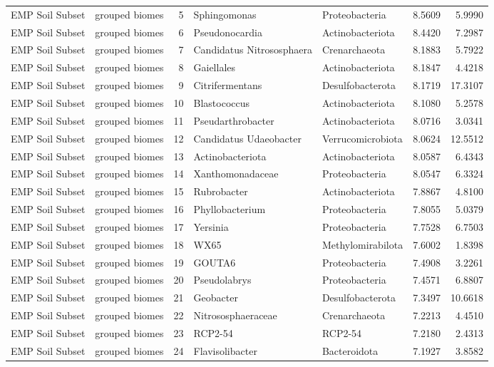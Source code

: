\documentclass[12pt, oneside]{report}
\begin{document}
\begin{center}
\begin{longtable}{llrp{2.7cm}p{2.2cm}rr}
EMP Soil Subset & grouped biomes & 5 & Sphingomonas & Proteobacteria & 8.5609 & 5.9990 \\
EMP Soil Subset & grouped biomes & 6 & Pseudonocardia & Actinobacteriota & 8.4420 & 7.2987 \\
EMP Soil Subset & grouped biomes & 7 & Candidatus Nitrososphaera & Crenarchaeota & 8.1883 & 5.7922 \\
EMP Soil Subset & grouped biomes & 8 & Gaiellales & Actinobacteriota & 8.1847 & 4.4218 \\
EMP Soil Subset & grouped biomes & 9 & Citrifermentans & Desulfobacterota & 8.1719 & 17.3107 \\
EMP Soil Subset & grouped biomes & 10 & Blastococcus & Actinobacteriota & 8.1080 & 5.2578 \\
EMP Soil Subset & grouped biomes & 11 & Pseudarthrobacter & Actinobacteriota & 8.0716 & 3.0341 \\
EMP Soil Subset & grouped biomes & 12 & Candidatus Udaeobacter & Verrucomicrobiota & 8.0624 & 12.5512 \\
EMP Soil Subset & grouped biomes & 13 & Actinobacteriota & Actinobacteriota & 8.0587 & 6.4343 \\
EMP Soil Subset & grouped biomes & 14 & Xanthomonadaceae & Proteobacteria & 8.0547 & 6.3324 \\
EMP Soil Subset & grouped biomes & 15 & Rubrobacter & Actinobacteriota & 7.8867 & 4.8100 \\
EMP Soil Subset & grouped biomes & 16 & Phyllobacterium & Proteobacteria & 7.8055 & 5.0379 \\
EMP Soil Subset & grouped biomes & 17 & Yersinia & Proteobacteria & 7.7528 & 6.7503 \\
EMP Soil Subset & grouped biomes & 18 & WX65 & Methylomirabilota & 7.6002 & 1.8398 \\
EMP Soil Subset & grouped biomes & 19 & GOUTA6 & Proteobacteria & 7.4908 & 3.2261 \\
EMP Soil Subset & grouped biomes & 20 & Pseudolabrys & Proteobacteria & 7.4571 & 6.8807 \\
EMP Soil Subset & grouped biomes & 21 & Geobacter & Desulfobacterota & 7.3497 & 10.6618 \\
EMP Soil Subset & grouped biomes & 22 & Nitrososphaeraceae & Crenarchaeota & 7.2213 & 4.4510 \\
EMP Soil Subset & grouped biomes & 23 & RCP2-54 & RCP2-54 & 7.2180 & 2.4313 \\
EMP Soil Subset & grouped biomes & 24 & Flavisolibacter & Bacteroidota & 7.1927 & 3.8582 \\

\end{longtable}
\end{center}
\end{document}
